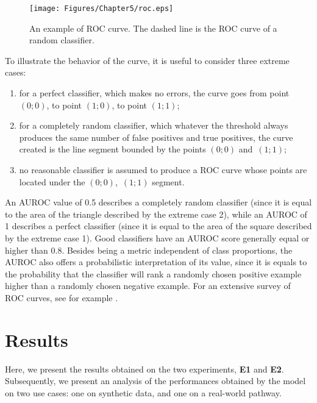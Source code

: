 \begin{figure}[h!]
    \centering
    \texttt{[image: Figures/Chapter5/roc.eps]}
    \caption{An example of ROC curve. The dashed line is the ROC curve of a random classifier.}
    \label{fig:roc}
\end{figure}
To illustrate the behavior of the curve, it is useful to consider three extreme cases:
\begin{enumerate}
\item for a perfect classifier, which makes no errors, the curve goes from point $(0;0)$, to point $(1;0)$, to point $(1;1)$;
\item for a completely random classifier, which whatever the threshold always produces the same number of false positives and true positives, the curve created is the line segment bounded by the points $(0;0)$ and $\,(1;1)$;
\item no reasonable classifier is assumed to produce a ROC curve whose points are located under the $(0;0)$, $\,(1;1)$ segment.
\end{enumerate}
An AUROC value of 0.5 describes a completely random classifier (since it is equal to the area of the triangle described by the extreme case 2), while an AUROC of 1 describes a perfect classifier (since it is equal to the area of the square described by the extreme case 1). Good classifiers have an AUROC score generally equal or higher than 0.8. Besides being a metric independent of class proportions, the AUROC also offers a probabilistic interpretation of its value, since it is equals to the probability that the classifier will rank a randomly chosen positive example higher than a randomly chosen negative example. For an extensive survey of ROC curves, see for example \cite{fawcett2006roc}.

\section{Results}
Here, we present the results obtained on the two experiments, \textbf{E1} and \textbf{E2}. Subsequently, we present an analysis of the performances obtained by the model on two use cases: one on synthetic data, and one on a real-world pathway.

